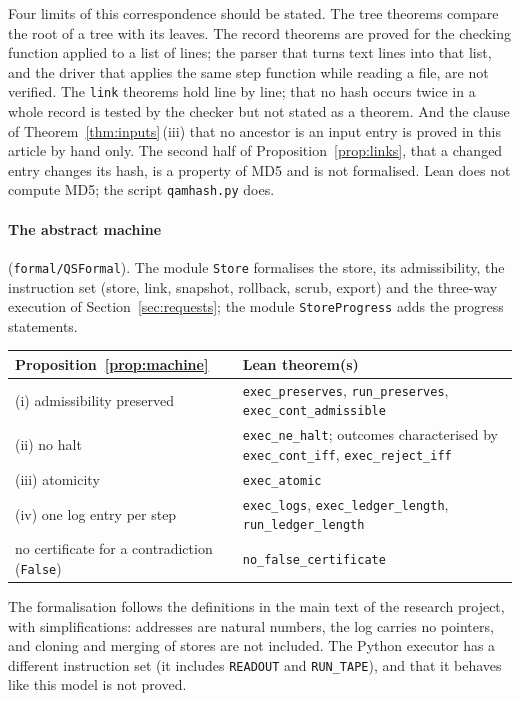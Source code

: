 Four limits of this correspondence should be stated. The tree theorems compare the root of a tree with its leaves. The record theorems
are proved for the checking function applied to a list of lines; the parser that turns text lines into that list, and the driver that
applies the same step function while reading a file, are not verified. The \texttt{link} theorems hold line by line; that no hash
occurs twice in a whole record is tested by the checker but not stated as a theorem. And the clause of
Theorem~\ref{thm:inputs}\,(iii) that no ancestor is an input entry is proved in this article by hand only. The second half of
Proposition~\ref{prop:links}, that a changed entry changes its hash, is a property of MD5 and is not formalised. Lean does
not compute MD5; the script \texttt{qamhash.py} does.

\paragraph{The abstract machine} (\texttt{formal/QSFormal}). The module \texttt{Store} formalises the store, its admissibility, the
instruction set (store, link, snapshot, rollback, scrub, export) and the three-way execution of Section~\ref{sec:requests}; the module
\texttt{StoreProgress} adds the progress statements.
\begin{center}
\small
\begin{tabular}{@{}p{}p{}@{}}
\toprule
Proposition~\ref{prop:machine} & Lean theorem(s)\\
\midrule
(i) admissibility preserved & \texttt{exec\_preserves}, \texttt{run\_preserves}, \texttt{exec\_cont\_admissible}\\
(ii) no halt & \texttt{exec\_ne\_halt}; outcomes characterised by \texttt{exec\_cont\_iff}, \texttt{exec\_reject\_iff}\\
(iii) atomicity & \texttt{exec\_atomic}\\
(iv) one log entry per step & \texttt{exec\_logs}, \texttt{exec\_ledger\_length}, \texttt{run\_ledger\_length}\\
no certificate for a contradiction (\texttt{False}) & \texttt{no\_false\_certificate}\\
\bottomrule
\end{tabular}
\end{center}
The formalisation follows the definitions in the main text of the research project, with simplifications: addresses are natural
numbers, the log carries no pointers, and cloning and merging of stores are not included. The Python executor has a different
instruction set (it includes \texttt{READOUT} and \texttt{RUN\_TAPE}), and that it behaves like this model is not proved.
